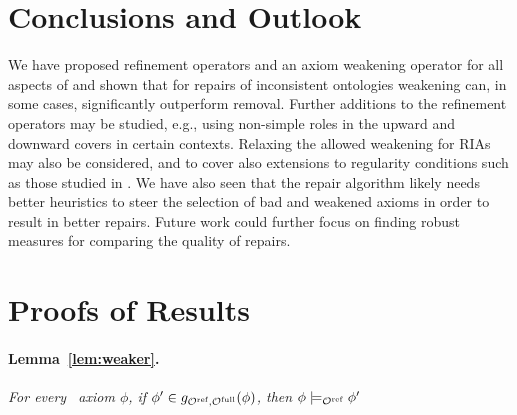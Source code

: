 \documentclass[
]{ceurart}
\begin{document}
\section{Conclusions and Outlook}

We have proposed refinement operators and an axiom weakening operator for all aspects of \SROIQ and shown that for repairs of inconsistent ontologies weakening can, in some cases, significantly outperform removal. Further additions to the refinement operators may be studied, e.g., using non-simple roles in the upward and downward covers in certain contexts. Relaxing the allowed weakening for RIAs may also be considered, and to cover also extensions to regularity conditions such as those studied in \cite{DBLP:conf/cade/Kazakov10}. We have also seen that the repair algorithm likely needs better heuristics to steer the selection of bad and weakened axioms in order to result in better repairs. Future work could further focus on finding robust measures for comparing the quality of repairs.



\cleardoublepage

\appendix

\section{Proofs of Results}
\paragraph{Lemma~\ref{lem:weaker}.}
{\it   For every \SROIQ\  axiom $\phi$, if $\phi' \in g_{{\mathcal{O}^\textnormal{ref}},{\mathcal{O}^\textnormal{full}}}(\phi)$, then $\phi \models_{\mathcal{O}^\textnormal{ref}} \phi'$
}
\end{document}
